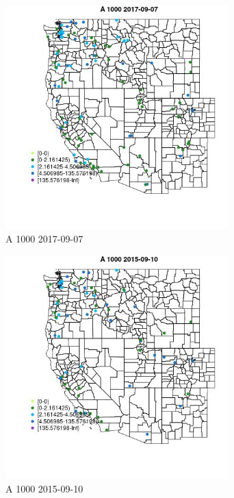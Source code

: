 \begin{figure} 
\centering  
\includegraphics[width=0.77\textwidth]{Code_Outputs/Report_ML_input_PM25_Step4_part_e_de_duplicated_aveswNAs_MapObsA_10002017-09-07.jpg} 
\caption{\label{fig:Report_ML_input_PM25_Step4_part_e_de_duplicated_aveswNAsMapObsA_10002017-09-07}A 1000 2017-09-07} 
\end{figure} 
 

\begin{figure} 
\centering  
\includegraphics[width=0.77\textwidth]{Code_Outputs/Report_ML_input_PM25_Step4_part_e_de_duplicated_aveswNAs_MapObsA_10002015-09-10.jpg} 
\caption{\label{fig:Report_ML_input_PM25_Step4_part_e_de_duplicated_aveswNAsMapObsA_10002015-09-10}A 1000 2015-09-10} 
\end{figure} 
 

